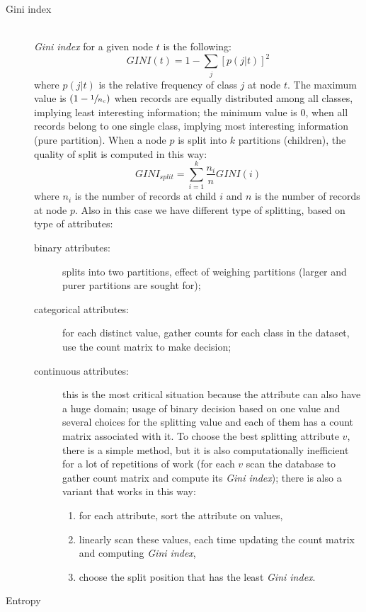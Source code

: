 \begin{description}
	\item[Gini index]\mbox{}\\
	\emph{Gini index} for a given node $t$ is the following:
	$$
		GINI(t) = 1 - \sum_{j}\left[p\left(j|t\right)\right]^2
	$$
	where $p\left(j|t\right)$ is the relative frequency of class $j$ at node $t$.
	The maximum value is $(1 - \sfrac{1}{n_c})$ when records are equally distributed among all classes, implying least interesting information; the minimum value is $0$, when all records belong to one single class, implying most interesting information (pure partition).
	When a node $p$ is split into $k$ partitions (children), the quality of split is computed in this way:
	$$
		GINI_{split} = \sum_{i = 1}^{k} \frac{n_i}{n}GINI(i)
	$$
	where $n_i$ is the number of records at child $i$ and $n$ is the number of records at node $p$.
	Also in this case we have different type of splitting, based on type of attributes:
	\begin{description}
		\item[binary attributes:] splits into two partitions, effect of weighing partitions (larger and purer partitions are sought for);
		\item[categorical attributes:] for each distinct value, gather counts for each class in the dataset, use the count matrix to make decision;
		\item[continuous attributes:] this is the most critical situation because the attribute can also have a huge domain; usage of binary decision based on one value and several choices for the splitting value and each of them has a count matrix associated with it. To choose the best splitting attribute $v$, there is a simple method, but it is also computationally inefficient for a lot of repetitions of work (for each $v$ scan the database to gather count matrix and compute its \emph{Gini index}); there is also a variant that works in this way:
		\begin{enumerate}
			\item
			for each attribute, sort the attribute on values,
			\item
			linearly scan these values, each time updating the count matrix and computing \emph{Gini index},
			\item
			choose the split position that has the least \emph{Gini index}.
		\end{enumerate}		
	\end{description}
	\item[Entropy]\mbox{}\\

\end{description}
